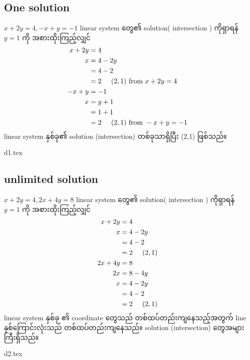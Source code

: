 \subsection*{One solution}
$x+2y=4, -x+y=-1$ linear system တွေ၏ solution( intersection ) ကိုရှာရန် $y=1$ ကို အစားထိုးကြည့်လျှင်
\[
    \begin{split}
        x+2y&=4 \\
        x&=4-2y \\
        &=4-2 \\
        &=2\hspace{5mm}(2,1)\text{ from }x+2y=4 \\
        -x+y&=-1 \\
        x&=y+1 \\
        &=1+1 \\
        &=2\hspace{5mm}(2,1)\text{ from }-x+y=-1 \\
    \end{split}
\]
linear system နှစ်ခု၏ solution (intersection) တစ်ခုသာရှိပြီး (2,1) ဖြစ်သည်။
\begin{center}
    {d1.tex}
\end{center}
\subsection*{unlimited solution}
$x+2y=4, 2x+4y=8$ linear system တွေ၏ solution( intersection ) ကိုရှာရန် $y=1$ ကို အစားထိုးကြည့်လျှင်
\[
    \begin{split}
        x+2y&=4 \\
        x&=4-2y \\
        &=4-2 \\
        &=2\hspace{5mm}(2,1) \\
        2x+4y&=8 \\
        2x&=8-4y \\
        x&=4-2y \\
        &=4-2 \\
        &=2\hspace{5mm}(2,1) \\
    \end{split}
\]
linear system နှစ်ခု ၏ coordinate တွေသည် တစ်ထပ်တည်းကျနေသည့်အတွက် line နှစ်ကြောင်းလုံးသည် တစ်ထပ်တည်းကျနေသည်။ solution (intersection) တွေအများကြီးရှိသည်။
\begin{center}
    {d2.tex}
\end{center}
